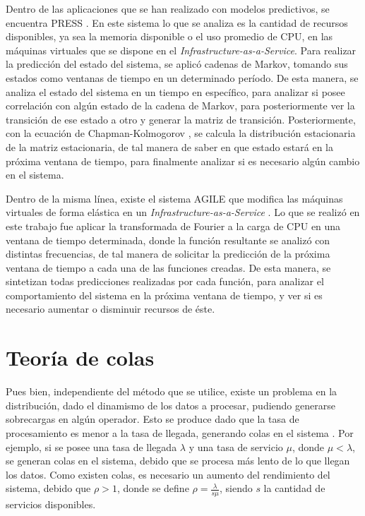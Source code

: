 Dentro de las aplicaciones que se han realizado con modelos predictivos, se encuentra PRESS \citep{GongGW10}. En este sistema lo que se analiza es la cantidad de recursos disponibles, ya sea la memoria disponible o el uso promedio de CPU, en las máquinas virtuales que se dispone en el \textit{Infrastructure-as-a-Service}. Para realizar la predicción del estado del sistema, se aplicó cadenas de Markov, tomando sus estados como ventanas de tiempo en un determinado período. De esta manera, se analiza el estado del sistema en un tiempo en específico, para analizar si posee correlación con algún estado de la cadena de Markov, para posteriormente ver la transición de ese estado a otro y generar la matriz de transición. Posteriormente, con la ecuación de Chapman-Kolmogorov \citep{Papoulis1984}, se calcula la distribución estacionaria de la matriz estacionaria, de tal manera de saber en que estado estará en la próxima ventana de tiempo, para finalmente analizar si es necesario algún cambio en el sistema.

Dentro de la misma línea, existe el sistema AGILE que modifica las máquinas virtuales de forma elástica en un \textit{Infrastructure-as-a-Service} \citep{NguyenSGSW13}. Lo que se realizó en este trabajo fue aplicar la transformada de Fourier a la carga de CPU en una ventana de tiempo determinada, donde la función resultante se analizó con distintas frecuencias, de tal manera de solicitar la predicción de la próxima ventana de tiempo a cada una de las funciones creadas. De esta manera, se sintetizan todas predicciones realizadas por cada función, para analizar el comportamiento del sistema en la próxima ventana de tiempo, y ver si es necesario aumentar o disminuir recursos de éste.

\section{Teoría de colas}

Pues bien, independiente del método que se utilice, existe un problema en la distribución, dado el dinamismo de los datos a procesar, pudiendo generarse sobrecargas en algún operador. Esto se produce dado que la tasa de procesamiento es menor a la tasa de llegada, generando colas en el sistema \citep{queueingtheory}. Por ejemplo, si se posee una tasa de llegada $\lambda$ y una tasa de servicio $\mu$, donde $\mu < \lambda$, se generan colas en el sistema, debido que se procesa más lento de lo que llegan los datos. Como existen colas, es necesario un aumento del rendimiento del sistema, debido que $\rho > 1 $, donde se define $\rho = \frac{\lambda}{s\mu}$, siendo $s$ la cantidad de servicios disponibles.